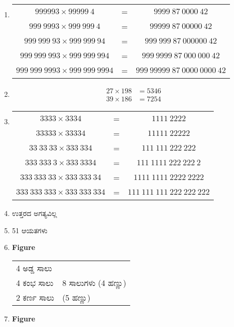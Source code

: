 \begin{enumerate}
\item 
\begin{tabular}[t]{ccc}
$999993\times 99999~4$ & = & $9999~87~0000~42$\\
$999~9993\times 999~999~4$ & = & $99999~87~00000~42$\\
$999~999~93\times 999~999~94$ & = & $999~999~87~000000~42$\\
$999~999~993\times 999~999~994$ & = & $999~9999~87~000~000~42$\\
$999~999~9993\times 999~999~9994$ & = & $999~99999~87~0000~0000~42$
\end{tabular}

\item 
\begin{align*}
27\times 198 & = 5346\\
39\times 186 & = 7254
\end{align*}

\item 
\begin{tabular}[t]{ccc}
$3333\times 3334$ & = & $1111~2222$\\
$33333\times 33334$ & = & $11111~22222$\\
$33~33~33\times 333~334$ & = & $111~111~222~222$\\
$333~333~3\times 333~3334$ & = & $111~1111~222~222~2$\\
$333~333~33\times 333~333~34$ & = & $1111~1111~2222~2222$\\
$333~333~333\times 333~333~334$ & = & $111~111~111~222~222~222$\\
\end{tabular}

\item ಉತ್ತರದ ಅಗತ್ಯವಿಲ್ಲ 

\item 51 ಆಯತಗಳು 

\item 
\begin{center}
{\bf Figure}
\end{center}
\begin{tabular}[t]{ll}
4 ಅಡ್ಡ ಸಾಲು & \\
4 ಕಂಭ ಸಾಲು & 8 ಸಾಲುಗಳು (4 ಹಣ್ಣು)\\[0.2cm]
2 ಕರ್ಣ ಸಾಲು & (5 ಹಣ್ಣು)
\end{tabular}

\item 
\begin{center}
{\bf Figure}
\end{center}


\end{enumerate}

